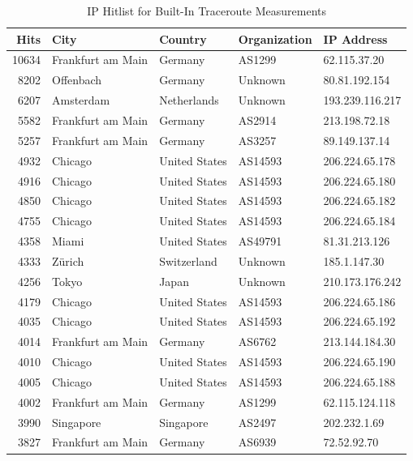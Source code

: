 \begin{table}
	\caption{IP Hitlist for Built-In Traceroute Measurements}
	\label{fig:ip-hitlist-traceroute}
	\begin{tabular}{rllll}
		\toprule
		Hits  & City              & Country       & Organization & IP Address      \\
		\midrule
		10634 & Frankfurt am Main & Germany       & AS1299       & 62.115.37.20    \\
		8202  & Offenbach         & Germany       & Unknown      & 80.81.192.154   \\
		6207  & Amsterdam         & Netherlands   & Unknown      & 193.239.116.217 \\
		5582  & Frankfurt am Main & Germany       & AS2914       & 213.198.72.18   \\
		5257  & Frankfurt am Main & Germany       & AS3257       & 89.149.137.14   \\
		4932  & Chicago           & United States & AS14593      & 206.224.65.178  \\
		4916  & Chicago           & United States & AS14593      & 206.224.65.180  \\
		4850  & Chicago           & United States & AS14593      & 206.224.65.182  \\
		4755  & Chicago           & United States & AS14593      & 206.224.65.184  \\
		4358  & Miami             & United States & AS49791      & 81.31.213.126   \\
		4333  & Zürich            & Switzerland   & Unknown      & 185.1.147.30    \\
		4256  & Tokyo             & Japan         & Unknown      & 210.173.176.242 \\
		4179  & Chicago           & United States & AS14593      & 206.224.65.186  \\
		4035  & Chicago           & United States & AS14593      & 206.224.65.192  \\
		4014  & Frankfurt am Main & Germany       & AS6762       & 213.144.184.30  \\
		4010  & Chicago           & United States & AS14593      & 206.224.65.190  \\
		4005  & Chicago           & United States & AS14593      & 206.224.65.188  \\
		4002  & Frankfurt am Main & Germany       & AS1299       & 62.115.124.118  \\
		3990  & Singapore         & Singapore     & AS2497       & 202.232.1.69    \\
		3827  & Frankfurt am Main & Germany       & AS6939       & 72.52.92.70     \\
		\bottomrule
	\end{tabular}
\end{table}

